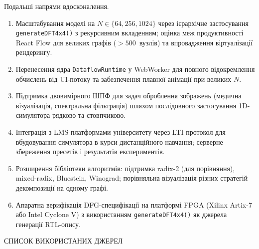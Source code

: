 \documentclass[
]{article}
\begin{document}
Подальші напрями вдосконалення.

\begin{enumerate}
\def\labelenumi{\arabic{enumi}.}
\item
  Масштабування моделі на \(N \in \{ 64,256,1024\}\) через ієрархічне
  застосування \texttt{generateDFT4x4()} з рекурсивним вкладенням;
  оцінка меж продуктивності React Flow для великих графів
  (\(> 500\)~вузлів) та впровадження віртуалізації рендерингу.
\item
  Перенесення ядра \texttt{DataflowRuntime} у WebWorker для повного
  відокремлення обчислень від UI-потоку та забезпечення плавної анімації
  при великих \(N\).
\item
  Підтримка двовимірного ШПФ для задач оброблення зображень (медична
  візуалізація, спектральна фільтрація) шляхом послідовного застосування
  1D-симулятора рядково та стовпчиково.
\item
  Інтеграція з LMS-платформами університету через LTI-протокол для
  вбудовування симулятора в курси дистанційного навчання; серверне
  збереження пресетів і результатів експериментів.
\item
  Розширення бібліотеки алгоритмів: підтримка radix-2 (для порівняння),
  mixed-radix, Bluestein, Winograd; порівняльна візуалізація різних
  стратегій декомпозиції на одному графі.
\item
  Апаратна верифікація DFG-специфікації на платформі FPGA (Xilinx
  Artix-7 або Intel Cyclone V) з використанням \texttt{generateDFT4x4()}
  як джерела генерації RTL-опису.
\end{enumerate}

\protect{}\label{_Toc228305380}{}СПИСОК ВИКОРИСТАНИХ ДЖЕРЕЛ
\end{document}
